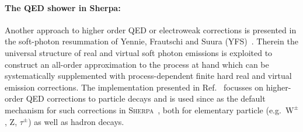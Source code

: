 \documentclass[11pt]{cernrep}
\DeclareRobustCommand{\PZ}{{\ensuremath{\mathrm{Z}}}}
\DeclareRobustCommand{\PWpm}{{\ensuremath{\mathrm{W}^{\pm}}}}
\begin{document}
\paragraph{The QED shower in Sherpa:}
Another approach to higher order QED or electroweak corrections is 
presented in the soft-photon resummation of Yennie, Frautschi and 
Suura (YFS)~\cite{Yennie:1961ad}. Therein the universal structure 
of real and virtual soft photon emissions is exploited to construct 
an all-order approximation to the process at hand which can be 
systematically supplemented with process-dependent finite hard 
real and virtual emission corrections. The implementation presented 
in Ref.~\cite{Schonherr:2008av} focusses on higher-order QED corrections 
to particle decays and is used since as the default mechanism for such 
corrections in \textsc{Sherpa}~\cite{Gleisberg:2008ta}, both for 
elementary particle (e.g.\ $\PWpm$, $\PZ$, $\tau^\pm$) as well as 
hadron decays. 
\end{document}
